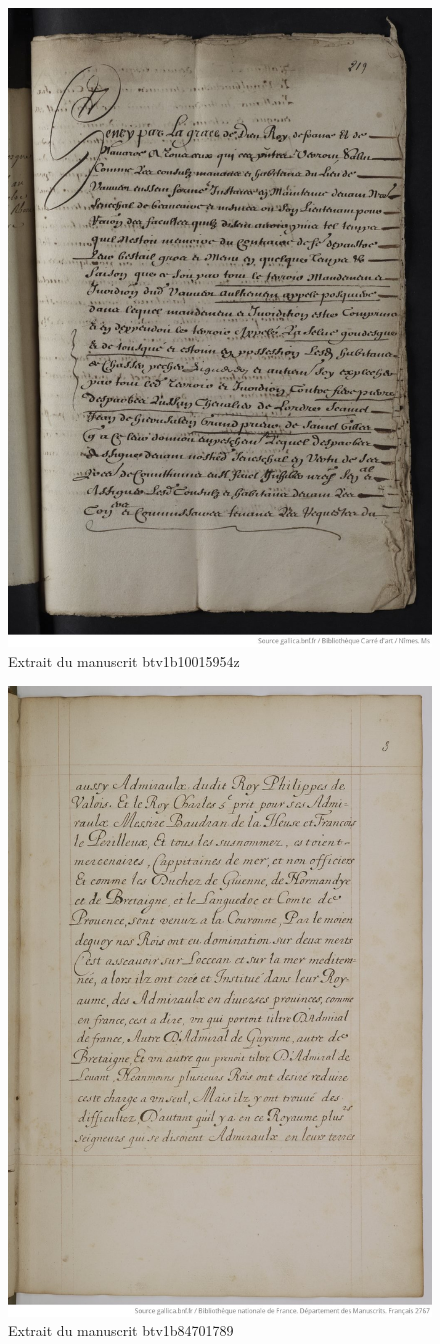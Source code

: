 \documentclass[a4paper,12pt,twoside]{book}
\begin{document}
\begin{figure}
	\centering
	\includegraphics[width=0.7\linewidth]{images/mss_bnf_ex_2}
	\caption{Extrait du manuscrit btv1b10015954z}
	\label{fig:mssbnfex2}
\end{figure}

\begin{figure}
	\centering
	\includegraphics[width=0.7\linewidth]{images/exbnf3}
	\caption{Extrait du manuscrit btv1b84701789}
	\label{fig:mssbnfex3}
\end{figure}
\end{document}

